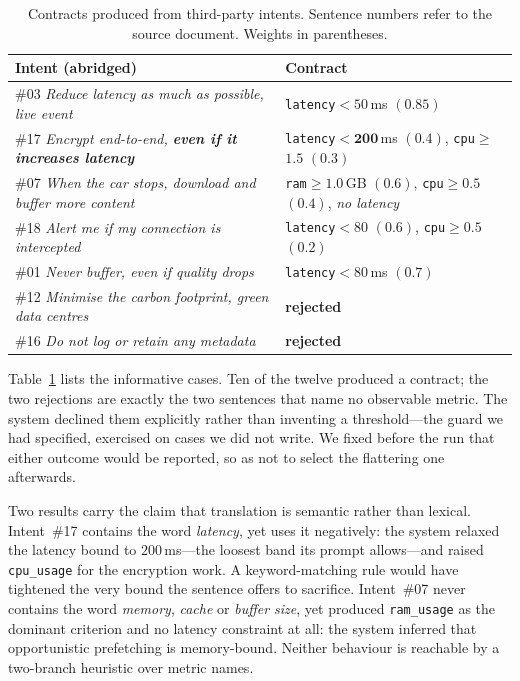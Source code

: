 \documentclass[conference]{IEEEtran}
\begin{document}
\begin{table}[t]
\centering
\caption{Contracts produced from third-party intents. Sentence numbers refer
to the source document. Weights in parentheses.}
\label{tab:thirdparty}
\footnotesize
\setlength{\tabcolsep}{3pt}
\begin{tabular}{@{}p{}p{}@{}}
\toprule
\textbf{Intent (abridged)} & \textbf{Contract}\\
\midrule
\#03 \emph{Reduce latency as much as possible, live event}
& \texttt{latency}$<$$50$\,ms $(0.85)$\\
\#17 \emph{Encrypt end-to-end, \textbf{even if it increases latency}}
& \texttt{latency}$<$$\mathbf{200}$\,ms $(0.4)$, \texttt{cpu}$\geq$$1.5$ $(0.3)$\\
\#07 \emph{When the car stops, download and buffer more content}
& \texttt{ram}$\geq$$1.0$\,GB $(\mathbf{0.6})$, \texttt{cpu}$\geq$$0.5$ $(0.4)$, \emph{no latency}\\
\#18 \emph{Alert me if my connection is intercepted}
& \texttt{latency}$<$$80$ $(0.6)$, \texttt{cpu}$\geq$$0.5$ $(0.2)$\\
\#01 \emph{Never buffer, even if quality drops}
& \texttt{latency}$<$$80$\,ms $(0.7)$\\
\#12 \emph{Minimise the carbon footprint, green data centres}
& \textbf{rejected}\\
\#16 \emph{Do not log or retain any metadata}
& \textbf{rejected}\\
\bottomrule
\end{tabular}
\end{table}

Table~\ref{tab:thirdparty} lists the informative cases. Ten of the twelve
produced a contract; the two rejections are exactly the two sentences that
name no observable metric. The system declined them explicitly
rather than inventing a threshold---the guard we had specified, exercised on
cases we did not write. We fixed before the run that either outcome would be
reported, so as not to select the flattering one afterwards.

Two results carry the claim that translation is semantic rather than lexical.
Intent~\#17 contains the word \emph{latency}, yet uses it negatively: the
system relaxed the latency bound to $200$\,ms---the loosest band its prompt
allows---and raised \texttt{cpu\_usage} for the encryption work. A
keyword-matching rule would have tightened the very bound the sentence
offers to sacrifice. Intent~\#07 never contains the word \emph{memory},
\emph{cache} or \emph{buffer size}, yet produced \texttt{ram\_usage} as the
dominant criterion and no latency constraint at all: the system inferred that
opportunistic prefetching is memory-bound. Neither behaviour is reachable by
a two-branch heuristic over metric names.
\end{document}
